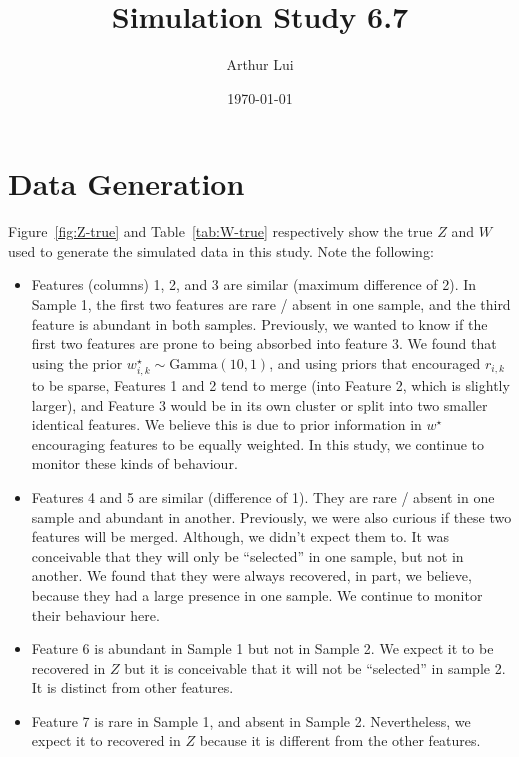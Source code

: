 \documentclass[10pt]{article} %
\title{Simulation Study 6.7}
\author{Arthur Lui}
\date{\today} %
\newcommand{\Gam}{ \text{Gamma} }
\begin{document}
\maketitle



\section{Data Generation}\label{sec:data-generation}
Figure~\ref{fig:Z-true} and Table~\ref{tab:W-true} respectively show the true
$Z$ and $W$ used to generate the simulated data in this study. Note the following:
\begin{itemize}
  \item Features (columns) 1, 2, and 3 are similar (maximum difference of 2).
    In Sample 1, the first two features are rare / absent in one sample, and
    the third feature is abundant in both samples. Previously, we wanted to
    know if the first two features are prone to being absorbed into feature 3. We
    found that using the prior $w^\star_{i,k} \sim \Gam(10, 1)$, and using priors
    that encouraged $r_{i,k}$ to be sparse, Features 1 and 2 tend to merge
    (into Feature 2, which is slightly larger), and Feature 3 would be in its
    own cluster or split into two smaller identical features. We believe this is 
    due to prior information in $w^\star$ encouraging features to be equally weighted.
    In this study, we continue to monitor these kinds of behaviour.
  \item Features 4 and 5 are similar (difference of 1). They are rare / absent
    in one sample and abundant in another. Previously, we were also curious if
    these two features will be merged. Although, we didn't expect them to. It was
    conceivable that they will only be ``selected'' in one sample, but not in
    another. We found that they were always recovered, in part, we believe, because
    they had a large presence in one sample. We continue to monitor their behaviour
    here.
  \item Feature 6 is abundant in Sample 1 but not in Sample 2. We expect it to be
    recovered in $Z$ but it is conceivable that it will not be ``selected'' in sample
    2. It is distinct from other features.
  \item Feature 7 is rare in Sample 1, and absent in Sample 2. Nevertheless, we
    expect it to recovered in $Z$ because it is different from the other
    features.
\end{itemize}
\end{document}
